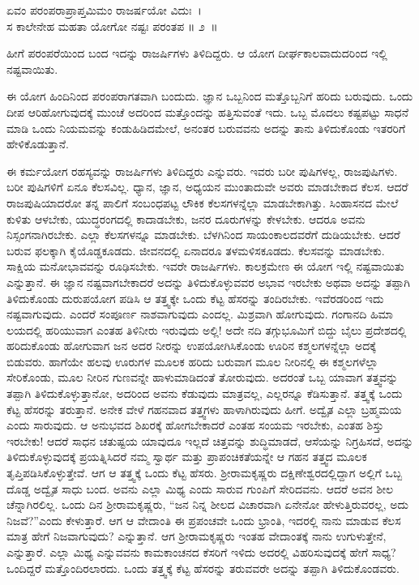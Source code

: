 \begin{shloka}
ಏವಂ ಪರಂಪರಾಪ್ರಾಪ್ತಮಿಮಂ ರಾಜರ್ಷಯೋ ವಿದುಃ~।\\ಸ ಕಾಲೇನೇಹ ಮಹತಾ ಯೋಗೋ ನಷ್ಟಃ ಪರಂತಪ \hfill॥ ೨~॥
\end{shloka}

\begin{artha}
ಹೀಗೆ ಪರಂಪರೆಯಿಂದ ಬಂದ ಇದನ್ನು ರಾಜರ್ಷಿಗಳು ತಿಳಿದಿದ್ದರು. ಆ ಯೋಗ ದೀರ್ಘ\-ಕಾಲವಾದುದರಿಂದ ಇಲ್ಲಿ ನಷ್ಟವಾಯಿತು.
\end{artha}

ಈ ಯೋಗ ಹಿಂದಿನಿಂದ ಪರಂಪರಾಗತವಾಗಿ ಬಂದುದು. ಜ್ಞಾನ ಒಬ್ಬನಿಂದ ಮತ್ತೊಬ್ಬನಿಗೆ ಹರಿದು ಬರುವುದು. ಒಂದು ದೀಪ ಆರಿಹೋಗುವುದಕ್ಕೆ ಮುಂಚೆ ಅದರಿಂದ ಮತ್ತೊಂದನ್ನು ಹತ್ತಿಸುವಂತೆ ಇದು. ಒಬ್ಬ ಮೊದಲು ಕಷ್ಟಪಟ್ಟು ಸಾಧನೆ ಮಾಡಿ ಒಂದು ನಿಯಮವನ್ನು ಕಂಡುಹಿಡಿದಮೇಲೆ, ಅನಂತರ ಬರುವವನು ಅದನ್ನು ತಾನು ತಿಳಿದುಕೊಂಡು ಇತರರಿಗೆ ಹೇಳಿ\-ಕೊಡುತ್ತಾನೆ.

ಈ ಕರ್ಮಯೋಗ ರಹಸ್ಯವನ್ನು ರಾಜರ್ಷಿಗಳು ತಿಳಿದಿದ್ದರು ಎನ್ನುವರು. ಇವರು ಬರೀ ಪುಷಿಗಳಲ್ಲ, ರಾಜಪುಷಿಗಳು. ಬರೀ ಪುಷಿಗಳಿಗೆ ಏನೂ ಕೆಲಸವಿಲ್ಲ. ಧ್ಯಾನ, ಜ್ಞಾನ, ಅಧ್ಯಯನ ಮುಂತಾದುವೇ ಅವರು ಮಾಡಬೇಕಾದ ಕೆಲಸ. ಆದರೆ ರಾಜಪುಷಿಯಾದರೋ ತನ್ನ ಪಾಲಿಗೆ ಸಂಬಂಧಪಟ್ಟ ಲೌಕಿಕ ಕೆಲಸಗಳನ್ನೆಲ್ಲಾ ಮಾಡಬೇಕಾಗಿತ್ತು. ಸಿಂಹಾಸನದ ಮೇಲೆ ಕುಳಿತು ಆಳಬೇಕು, ಯುದ್ಧರಂಗದಲ್ಲಿ ಕಾದಾಡಬೇಕು, ಜನರ ದೂರುಗಳನ್ನು ಕೇಳಬೇಕು. ಆದರೂ ಅವನು ನಿಸ್ಸಂಗನಾಗಿರಬೇಕು. ಎಲ್ಲಾ ಕೆಲಸಗಳನ್ನೂ ಮಾಡಬೇಕು. ಬೆಳಗಿನಿಂದ ಸಾಯಂಕಾಲದವರೆಗೆ ದುಡಿಯಬೇಕು. ಆದರೆ ಬರುವ ಫಲಕ್ಕಾಗಿ ಕೈಯೊಡ್ಡಕೂಡದು. ಜೀವನದಲ್ಲಿ ಏನಾದರೂ ತಳಮಳಿಸಕೂಡದು. ಕೆಲಸವನ್ನು ಮಾಡಬೇಕು. ಸಾಕ್ಷಿಯ ಮನೋಭಾವವನ್ನು ರೂಢಿಸಬೇಕು. ಇವರೇ ರಾಜರ್ಷಿಗಳು. ಕಾಲಕ್ರಮೇಣ ಈ ಯೋಗ ಇಲ್ಲಿ ನಷ್ಟವಾಯಿತು ಎನ್ನುತ್ತಾನೆ. ಈ ಜ್ಞಾನ ನಷ್ಟವಾಗಬೇಕಾದರೆ ಅದನ್ನು ತಿಳಿದುಕೊಳ್ಳುವವರ ಅಭಾವ ಇರಬೇಕು ಅಥವಾ ಅದನ್ನು ತಪ್ಪಾಗಿ ತಿಳಿದುಕೊಂಡು ದುರುಪಯೋಗ ಪಡಿಸಿ ಆ ತತ್ತ್ವಕ್ಕೇ ಒಂದು ಕೆಟ್ಟ ಹೆಸರನ್ನು ತಂದಿರಬೇಕು. ಇವೆರಡರಿಂದ ಇದು ನಷ್ಟವಾಗುವುದು. ಎಂದರೆ ಸಂಪೂರ್ಣ ನಾಶವಾಗುವುದು ಎಂದಲ್ಲ. ಮಿಶ್ರವಾಗಿ ಹೋಗುವುದು. ಗಂಗಾನದಿ ಹಿಮಾ ಲಯದಲ್ಲಿ ಹರಿಯುವಾಗ ಎಂತಹ ತಿಳಿನೀರು ಇರುವುದು ಅಲ್ಲಿ! ಅದೇ ನದಿ ತಗ್ಗುಭೂಮಿಗೆ ಬಿದ್ದು ಬೈಲು ಪ್ರದೇಶದಲ್ಲಿ ಹರಿದುಕೊಂಡು ಹೋಗುವಾಗ ಜನ ಅದರ ನೀರನ್ನು ಉಪಯೋಗಿಸಿಕೊಂಡು ಊರಿನ ಕಶ್ಮಲಗಳನ್ನೆಲ್ಲಾ ಅದಕ್ಕೆ ಬಿಡುವರು. ಹಾಗೆಯೇ ಹಲವು ಊರುಗಳ ಮೂಲಕ ಹರಿದು ಬರುವಾಗ ಮೂಲ ನೀರಿನಲ್ಲಿ ಈ ಕಶ್ಮಲಗಳೆಲ್ಲಾ ಸೇರಿಕೊಂಡು, ಮೂಲ ನೀರಿನ ಗುಣವನ್ನೇ ಹಾಳುಮಾಡಿದಂತೆ ತೋರುವುದು. ಅದರಂತೆ ಒಬ್ಬ ಯಾವಾಗ ತತ್ತ್ವವನ್ನು ತಪ್ಪಾಗಿ ತಿಳಿದುಕೊಳ್ಳುತ್ತಾನೋ, ಅದರಿಂದ ಅವನು ಕೆಡುವುದು ಮಾತ್ರವಲ್ಲ, ಎಲ್ಲರನ್ನೂ ಕೆಡಿಸುತ್ತಾನೆ. ತತ್ತ್ವಕ್ಕೆ ಒಂದು ಕೆಟ್ಟ ಹೆಸರನ್ನು ತರುತ್ತಾನೆ. ಅನೇಕ ವೇಳೆ ಗಹನವಾದ ತತ್ತ್ವಗಳು ಹಾಳಾಗಿರುವುದು ಹೀಗೆ. ಅದ್ವೈತ ಎಲ್ಲಾ ಬ್ರಹ್ಮಮಯ ಎಂದು ಸಾರುವುದು. ಆ ಅನುಭವದ ಶಿಖರಕ್ಕೆ ಹೋಗಬೇಕಾದರೆ ಎಂತಹ ಸಂಯಮ ಇರಬೇಕು, ಎಂತಹ ಶಿಸ್ತು ಇರಬೇಕು! ಆದರೆ ಸಾಧನ ಚತುಷ್ಟಯ ಯಾವುದೂ ಇಲ್ಲದೆ ಚಿತ್ತವನ್ನು ಶುದ್ಧಿಮಾಡದೆ, ಆಸೆಯನ್ನು ನಿಗ್ರಹಿಸದೆ, ಅದನ್ನು ತಿಳಿದುಕೊಳ್ಳುವುದಕ್ಕೆ ಪ್ರಯತ್ನಿಸಿದರೆ ನಮ್ಮ ಸ್ವಾರ್ಥ ಮತ್ತು ಪ್ರಾಪಂಚಿಕತೆಯನ್ನೇ ಆ ಗಹನ ತತ್ತ್ವದ ಮೂಲಕ ತೃಪ್ತಿಪಡಿಸಿಕೊಳ್ಳುತ್ತೇವೆ. ಆಗ ಆ ತತ್ತ್ವಕ್ಕೆ ಒಂದು ಕೆಟ್ಟ ಹೆಸರು. ಶ‍್ರೀರಾಮಕೃಷ್ಣರು ದಕ್ಷಿಣೇಶ್ವರದಲ್ಲಿದ್ದಾಗ ಅಲ್ಲಿಗೆ ಒಬ್ಬ ದೊಡ್ಡ ಅದ್ವೈತ ಸಾಧು ಬಂದ. ಅವನು ಎಲ್ಲಾ ಮಿಥ್ಯ ಎಂದು ಸಾರುವ ಗುಂಪಿಗೆ ಸೇರಿದವನು. ಆದರೆ ಅವನ ಶೀಲ ಚೆನ್ನಾಗಿರಲಿಲ್ಲ. ಒಂದು ದಿನ ಶ‍್ರೀರಾಮಕೃಷ್ಣರು, “ಜನ ನಿನ್ನ ಶೀಲದ ವಿಚಾರವಾಗಿ ಏನೇನೋ ಹೇಳುತ್ತಿರುವರಲ್ಲ, ಅದು ನಿಜವೆ?”ಎಂದು ಕೇಳುತ್ತಾರೆ. ಆಗ ಆ ವೇದಾಂತಿ ಈ ಪ್ರಪಂಚವೇ ಒಂದು ಭ್ರಾಂತಿ, ಇದರಲ್ಲಿ ನಾನು ಮಾಡುವ ಕೆಲಸ ಮಾತ್ರ ಹೇಗೆ ನಿಜವಾಗುವುದು? ಎನ್ನುತ್ತಾನೆ. ಆಗ ಶ‍್ರೀರಾಮಕೃಷ್ಣರು ಇಂತಹ ವೇದಾಂತಕ್ಕೆ ನಾನು ಉಗುಳುತ್ತೇನೆ, ಎನ್ನುತ್ತಾರೆ. ಎಲ್ಲಾ ಮಿಥ್ಯ ಎನ್ನುವವನು ಕಾಮಕಾಂಚನದ ಕೆಸರಿಗೆ ಇಳಿದು ಅದರಲ್ಲಿ ವಿಹರಿಸುವುದಕ್ಕೆ ಹೇಗೆ ಸಾಧ್ಯ? ಒಂದಿದ್ದರೆ ಮತ್ತೊಂದಿರಲಾರದು. ಒಂದು ತತ್ತ್ವಕ್ಕೆ ಕೆಟ್ಟ ಹೆಸರನ್ನು ತರುವವರೇ ಅದನ್ನು ತಪ್ಪಾಗಿ ತಿಳಿದುಕೊಂಡವರು.

